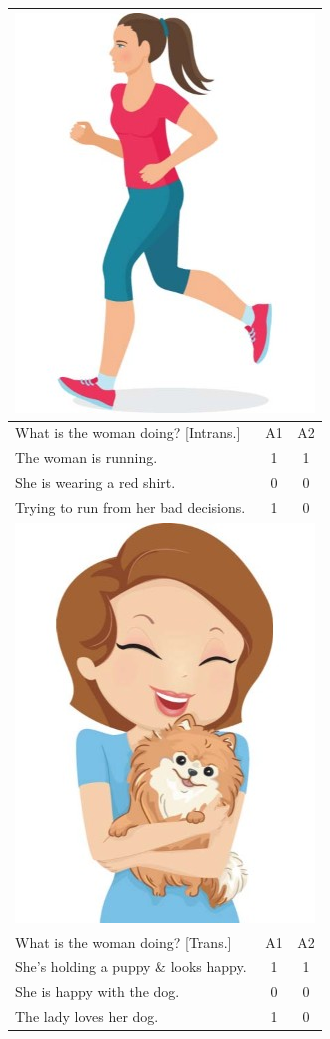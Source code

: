 \documentclass[11pt,a4paper]{article}
\begin{document}
\begin{table}[t!]
\begin{center}
\begin{tabular}{|l|c|c|}
\hline
\multicolumn{3}{|c|}{\includegraphics[width=0.35\columnwidth]{figures/I30.jpg}} \\
\hline
What is the woman doing? [Intrans.] & A1 & A2 \\
\hline
The woman is running. & 1 & 1 \\
\hline
She is wearing a red shirt. & 0 & 0 \\
\hline
Trying to run from her bad decisions. & 1 & 0 \\
\hline
\hline
\multicolumn{3}{|c|}{\includegraphics[width=0.35\columnwidth]{figures/I29.jpg}} \\
\hline
What is the woman doing? [Trans.] & A1 & A2 \\
\hline
She's holding a puppy \& looks happy. & 1 & 1 \\
\hline
She is happy with the dog. & 0 & 0 \\
\hline
The lady loves her dog. & 1 & 0 \\
\hline
\hline

\end{tabular}
\end{center}
\end{table}
\end{document}

